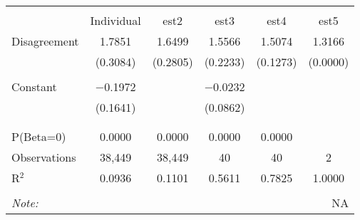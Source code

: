  \begin{table}[!htbp] \centering    \caption{}    \label{}  \begin{tabular}{@{\extracolsep{5pt}}lccccc}  \\[-1.8ex]\hline  \hline \\[-1.8ex]   & Individual & est2 & est3 & est4 & est5 \\   Disagreement & 1.7851 & 1.6499 & 1.5566 & 1.5074 & 1.3166 \\    & (0.3084) & (0.2805) & (0.2233) & (0.1273) & (0.0000) \\    & & & & & \\   Constant & $-$0.1972 &  & $-$0.0232 &  &  \\    & (0.1641) &  & (0.0862) &  &  \\    & & & & & \\  \hline \\[-1.8ex]  P(Beta=0) & 0.0000 & 0.0000 & 0.0000 & 0.0000 &  \\  Observations & 38,449 & 38,449 & 40 & 40 & 2 \\  R$^{2}$ & 0.0936 & 0.1101 & 0.5611 & 0.7825 & 1.0000 \\  \hline  \hline \\[-1.8ex]  \textit{Note:}  & \multicolumn{5}{r}{NA} \\  \end{tabular}  \end{table} 